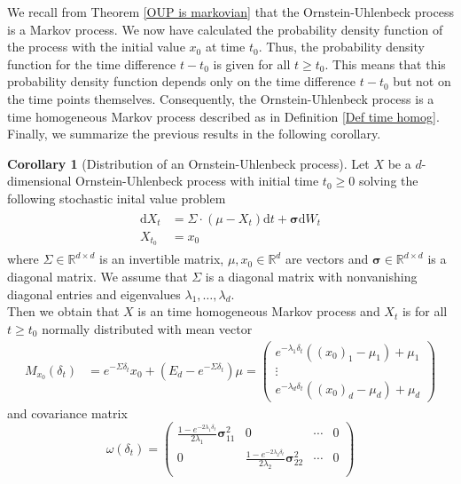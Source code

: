 \documentclass[11pt,titlepage]{article}
\newcommand{\R}{\mathbb{R}} %
\theoremstyle{definition}
\newtheorem{corollary}[theorem]{Corollary}
\theoremstyle{remark}
\begin{document}
	We recall from Theorem \ref{OUP is markovian} that the Ornstein-Uhlenbeck process is a Markov process. We now have calculated the probability density function of the process with the initial value $x_0$ at time $t_0$. Thus, the probability density function for the time difference $t-t_0$ is given for all $t\geq t_0$. This means that this probability density function depends only on the time difference $t-t_0$ but not on the time points themselves. Consequently, the Ornstein-Uhlenbeck process is a time homogeneous Markov process described as in Definition \ref{Def time homog}.\\	
	Finally, we summarize the previous results in the following corollary.
	\begin{corollary}[Distribution of an Ornstein-Uhlenbeck process]\label{coroll OUP Eigenschaften}
		Let $X$ be a $d$-dimensional Ornstein-Uhlenbeck process with initial time $t_0\geq 0$ solving the following stochastic inital value problem
		\begin{align*}
			\begin{split}
				\mathrm{d}X_t &= \Sigma\cdot (\mu-X_t)\mathrm{d}t +\boldsymbol{\sigma} \mathrm{d}W_t\\
				X_{t_0}&=x_0
			\end{split}
		\end{align*}
		where $\Sigma\in\R^{d\times d}$ is an invertible matrix, $\mu,x_0\in\R^d$ are vectors and $\boldsymbol{\sigma}\in\R^{d\times d}$ is a diagonal matrix. We assume that $\Sigma$ is a diagonal matrix with nonvanishing diagonal entries and eigenvalues $\lambda_1,\ldots,\lambda_d$. \\
		Then we obtain that $X$ is an time homogeneous Markov process and $X_t$ is for all $t\geq t_0$ normally distributed with mean vector
		\begin{align*}
			M_{x_0}(\delta_t) &= e^{-\Sigma \delta_t}x_0 +(E_d-e^{-\Sigma \delta_t})\mu
			= \begin{pmatrix}
				e^{-\lambda_1 \delta_t} ((x_0)_1 - \mu_1) + \mu_1 \\
				\vdots \\
				e^{-\lambda_d \delta_t} ((x_0)_d - \mu_d) + \mu_d
			\end{pmatrix}
		\end{align*}
		and covariance matrix
		\[\omega(\delta_t) = \begin{pmatrix}
			\frac{1- e^{-2\lambda_1 \delta_t}}{2\lambda_1} \boldsymbol{\sigma}_{11}^2  & 0 &\cdots & 0 \\
			0 & \frac{1- e^{-2\lambda_2 \delta_t}}{2\lambda_2} \boldsymbol{\sigma}_{22}^2  & \cdots & 0 \\

\end{pmatrix}\]
\end{corollary}
\end{document}
